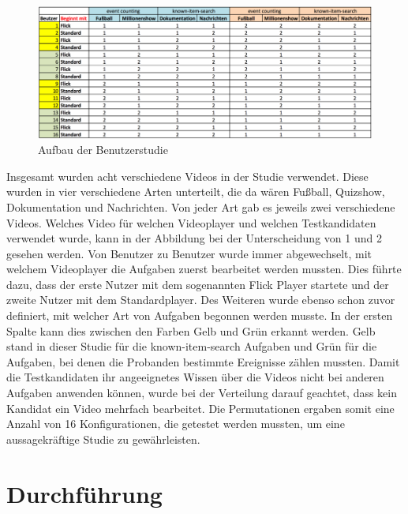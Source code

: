 \documentclass[11pt,a4paper]{report}
\begin{document}
\begin{figure}[h]
\begin{center}
\includegraphics[scale=0.9]{./images/32.png}
\caption{Aufbau der Benutzerstudie}
\label{aufbau_studie}
\end{center}
\end{figure}
Insgesamt wurden acht verschiedene Videos in der Studie verwendet. Diese wurden in vier verschiedene Arten unterteilt, die da wären Fußball, Quizshow, Dokumentation und Nachrichten. Von jeder Art gab es jeweils zwei verschiedene Videos. Welches Video für welchen Videoplayer und welchen Testkandidaten verwendet wurde, kann in der Abbildung bei der Unterscheidung von 1 und 2 gesehen werden. Von Benutzer zu Benutzer wurde immer abgewechselt, mit welchem Videoplayer die Aufgaben zuerst bearbeitet werden mussten. Dies führte dazu, dass der erste Nutzer mit dem sogenannten Flick Player startete und der zweite Nutzer mit dem Standardplayer. Des Weiteren wurde ebenso schon zuvor definiert, mit welcher Art von Aufgaben begonnen werden musste. In der ersten Spalte kann dies zwischen den Farben Gelb und Grün erkannt werden. Gelb stand in dieser Studie für die known-item-search Aufgaben und Grün für die Aufgaben, bei denen die Probanden bestimmte Ereignisse zählen mussten. Damit die Testkandidaten ihr angeeignetes Wissen über die Videos nicht bei anderen Aufgaben anwenden können, wurde bei der Verteilung darauf geachtet, dass kein Kandidat ein Video mehrfach bearbeitet. Die Permutationen ergaben somit eine Anzahl von 16 Konfigurationen, die getestet werden mussten, um eine aussagekräftige Studie zu gewährleisten.

\section{Durchführung}
\end{document}
